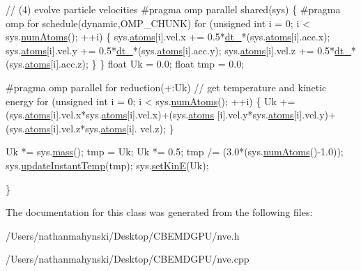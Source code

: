 \begin{DoxyCode}
    \textcolor{comment}{// (4) evolve particle velocities}
\textcolor{preprocessor}{    #pragma omp parallel shared(sys)}
\textcolor{preprocessor}{}    \{
\textcolor{preprocessor}{    #pragma omp for schedule(dynamic,OMP\_CHUNK)}
\textcolor{preprocessor}{}    \textcolor{keywordflow}{for} (\textcolor{keywordtype}{unsigned} \textcolor{keywordtype}{int} i = 0; i < sys.\hyperlink{classsystem_definition_ae8d3c2df2d56241cee03fcc4e2026ae0}{numAtoms}(); ++i) \{
            sys.\hyperlink{classsystem_definition_ae8814d3f60fc1111af2a3f218a4bfcab}{atoms}[i].vel.x += 0.5*\hyperlink{classintegrator_a6e4712b8597e3c40124316d2e9dd5051}{dt\_}*(sys.\hyperlink{classsystem_definition_ae8814d3f60fc1111af2a3f218a4bfcab}{atoms}[i].acc.x);
            sys.\hyperlink{classsystem_definition_ae8814d3f60fc1111af2a3f218a4bfcab}{atoms}[i].vel.y += 0.5*\hyperlink{classintegrator_a6e4712b8597e3c40124316d2e9dd5051}{dt\_}*(sys.\hyperlink{classsystem_definition_ae8814d3f60fc1111af2a3f218a4bfcab}{atoms}[i].acc.y);
            sys.\hyperlink{classsystem_definition_ae8814d3f60fc1111af2a3f218a4bfcab}{atoms}[i].vel.z += 0.5*\hyperlink{classintegrator_a6e4712b8597e3c40124316d2e9dd5051}{dt\_}*(sys.\hyperlink{classsystem_definition_ae8814d3f60fc1111af2a3f218a4bfcab}{atoms}[i].acc.z);
    \}
    \}
    \textcolor{keywordtype}{float} Uk = 0.0;
    \textcolor{keywordtype}{float} tmp = 0.0;

\textcolor{preprocessor}{    #pragma omp parallel for reduction(+:Uk)}
\textcolor{preprocessor}{}    \textcolor{comment}{// get temperature and kinetic energy}
    \textcolor{keywordflow}{for} (\textcolor{keywordtype}{unsigned} \textcolor{keywordtype}{int} i = 0; i < sys.\hyperlink{classsystem_definition_ae8d3c2df2d56241cee03fcc4e2026ae0}{numAtoms}(); ++i) \{
        Uk += (sys.\hyperlink{classsystem_definition_ae8814d3f60fc1111af2a3f218a4bfcab}{atoms}[i].vel.x*sys.\hyperlink{classsystem_definition_ae8814d3f60fc1111af2a3f218a4bfcab}{atoms}[i].vel.x)+(sys.\hyperlink{classsystem_definition_ae8814d3f60fc1111af2a3f218a4bfcab}{atoms}
      [i].vel.y*sys.\hyperlink{classsystem_definition_ae8814d3f60fc1111af2a3f218a4bfcab}{atoms}[i].vel.y)+(sys.\hyperlink{classsystem_definition_ae8814d3f60fc1111af2a3f218a4bfcab}{atoms}[i].vel.z*sys.\hyperlink{classsystem_definition_ae8814d3f60fc1111af2a3f218a4bfcab}{atoms}[i].
      vel.z);
    \}
    
    Uk *= sys.\hyperlink{classsystem_definition_acb6dd3df121e3e5bc0eb41c32bd937bd}{mass}();
    tmp = Uk;
    Uk *= 0.5;
    tmp /= (3.0*(sys.\hyperlink{classsystem_definition_ae8d3c2df2d56241cee03fcc4e2026ae0}{numAtoms}()-1.0));
    sys.\hyperlink{classsystem_definition_a285e6cd1de35ed125eecb20f0f774ab3}{updateInstantTemp}(tmp);
    sys.\hyperlink{classsystem_definition_a2b2c236698886bd1d106be802b987b61}{setKinE}(Uk);

\}
\end{DoxyCode}


The documentation for this class was generated from the following files\-:\begin{DoxyCompactItemize}
\item 
/\-Users/nathanmahynski/\-Desktop/\-C\-B\-E\-M\-D\-G\-P\-U/nve.\-h\item 
/\-Users/nathanmahynski/\-Desktop/\-C\-B\-E\-M\-D\-G\-P\-U/nve.\-cpp\end{DoxyCompactItemize}
